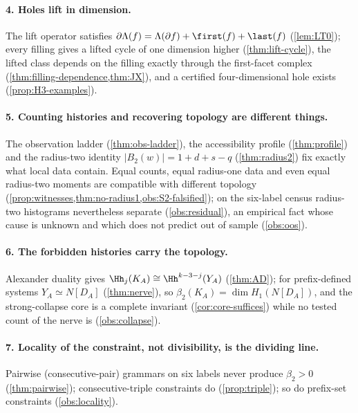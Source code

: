 \paragraph{4. Holes lift in dimension.} The lift operator satisfies $\partial\Lambda(f)=\Lambda(\partial f)+\first(f)+\last(f)$ (\cref{lem:LT0}); every filling gives a lifted cycle of one dimension higher (\cref{thm:lift-cycle}), the lifted class depends on the filling exactly through the first-facet complex (\cref{thm:filling-dependence,thm:JX}), and a certified four-dimensional hole exists (\cref{prop:H3-examples}).

\paragraph{5. Counting histories and recovering topology are different things.} The observation ladder (\cref{thm:obs-ladder}), the accessibility profile (\cref{thm:profile}) and the radius-two identity $|B_2(w)|=1+d+s-q$ (\cref{thm:radius2}) fix exactly what local data contain. Equal counts, equal radius-one data and even equal radius-two moments are compatible with different topology (\cref{prop:witnesses,thm:no-radius1,obs:S2-falsified}); on the six-label census radius-two histograms nevertheless separate (\cref{obs:residual}), an empirical fact whose cause is unknown and which does not predict out of sample (\cref{obs:oos}).

\paragraph{6. The forbidden histories carry the topology.} Alexander duality gives $\Hh_j(K_A)\cong\Hh^{k-3-j}(Y_A)$ (\cref{thm:AD}); for prefix-defined systems $Y_A\simeq N[D_A]$ (\cref{thm:nerve}), so $\beta_2(K_A)=\dim H_1(N[D_A])$, and the strong-collapse core is a complete invariant (\cref{cor:core-suffices}) while no tested count of the nerve is (\cref{obs:collapse}).

\paragraph{7. Locality of the constraint, not divisibility, is the dividing line.} Pairwise (consecutive-pair) grammars on six labels never produce $\beta_2>0$ (\cref{thm:pairwise}); consecutive-triple constraints do (\cref{prop:triple}); so do prefix-set constraints (\cref{obs:locality}).

